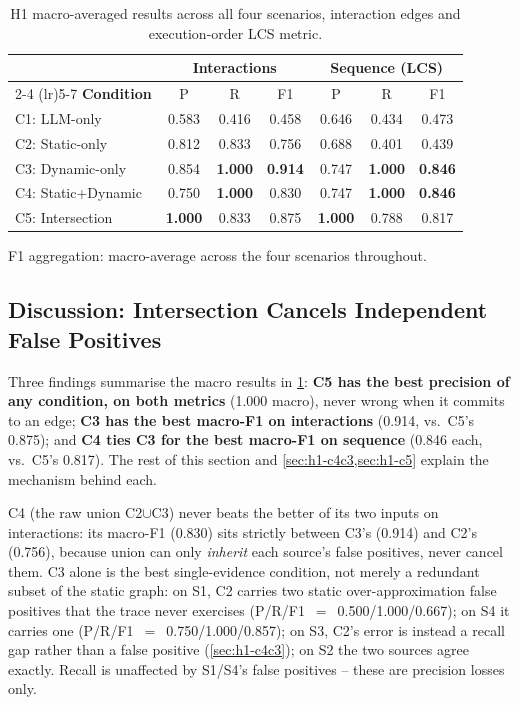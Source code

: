 \begin{table}[htb]
\centering
\caption{H1 macro-averaged results across all four scenarios, interaction
  edges and execution-order LCS metric.}
\label{tab:h1-results}
\small
\begin{tabular}{@{} l ccc ccc @{}}
\toprule
& \multicolumn{3}{c}{\textbf{Interactions}}
& \multicolumn{3}{c}{\textbf{Sequence (LCS)}} \\
\cmidrule(lr){2-4} \cmidrule(lr){5-7}
\textbf{Condition} & P & R & F1 & P & R & F1 \\
\midrule
C1: LLM-only       & 0.583 & 0.416 & 0.458 & 0.646 & 0.434 & 0.473 \\
C2: Static-only    & 0.812 & 0.833 & 0.756 & 0.688 & 0.401 & 0.439 \\
C3: Dynamic-only   & 0.854 & \textbf{1.000} & \textbf{0.914} & 0.747 & \textbf{1.000} & \textbf{0.846} \\
C4: Static+Dynamic & 0.750 & \textbf{1.000} & 0.830 & 0.747 & \textbf{1.000} & \textbf{0.846} \\
C5: Intersection   & \textbf{1.000} & 0.833 & 0.875 & \textbf{1.000} & 0.788 & 0.817 \\
\bottomrule
\end{tabular}
\end{table}

F1 aggregation: macro-average across the four scenarios throughout.

\subsection{Discussion: Intersection Cancels Independent False Positives}\label{sec:h1-c4c2}

Three findings summarise the macro results in \cref{tab:h1-results}:
\textbf{C5 has the best precision of any condition, on both metrics}
(1.000 macro), never wrong when it commits to an edge; \textbf{C3 has
the best macro-F1 on interactions} (0.914, vs.\ C5's 0.875); and
\textbf{C4 ties C3 for the best macro-F1 on sequence} (0.846 each, vs.\
C5's 0.817). The rest of this section and \cref{sec:h1-c4c3,sec:h1-c5}
explain the mechanism behind each.

C4 (the raw union C2$\cup$C3) never beats the better of its two inputs
on interactions: its macro-F1 (0.830) sits strictly between C3's
(0.914) and C2's (0.756), because union can only \emph{inherit} each
source's false positives, never cancel them. C3 alone is the best
single-evidence condition, not merely a redundant subset of the static
graph: on S1, C2 carries two static over-approximation false positives
that the trace never exercises (P/R/F1~$=$~0.500/1.000/0.667); on S4 it
carries one (P/R/F1~$=$~0.750/1.000/0.857); on S3, C2's error is instead
a recall gap rather than a false positive (\cref{sec:h1-c4c3}); on S2
the two sources agree exactly. Recall is unaffected by S1/S4's false
positives -- these are precision losses only.

